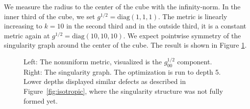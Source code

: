 \documentclass[../thesis.tex]{subfiles}
\begin{document}
We measure the radius to the center of the cube with the infinity-norm.
In the inner third of the cube, we set $g^{1/2}=\mathrm{diag}(1,1,1)$.
The metric is linearly increasing to $k=10$ in the second third
and in the outside third, it is a constant metric again at $g^{1/2}=\mathrm{diag}(10,10,10)$.
We expect pointwise symmetry of the singularity graph around the center of the cube.
The result is shown in Figure \ref{fig:nonuniform}. 
\begin{figure}[htb]
    \centering
    \def\svgwidth{25em}
    
    \caption{Left: The nonuniform metric, visualized is the $g_{00}^{1/2}$ component. Right: The singularity graph.
    The optimization is run to depth 5. Lower depths displayed similar defects as described in Figure~\ref{fig:isotropic}, where
    the singularity structure was not fully formed yet.}
    \label{fig:nonuniform}
\end{figure}
\end{document}
